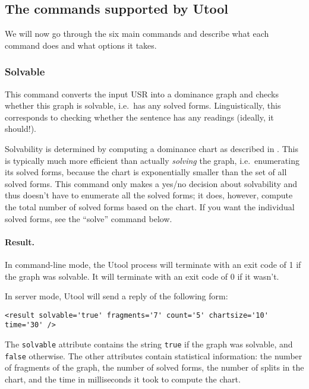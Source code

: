 \subsection{The commands supported by Utool}

We will now go through the six main commands and describe what each
command does and what options it takes.


\subsubsection{Solvable}

This command converts the input USR into a dominance graph and checks
whether this graph is solvable, i.e.\ has any solved
forms. Linguistically, this corresponds to checking whether the
sentence has any readings (ideally, it should!). 

Solvability is determined by computing a dominance chart as described
in \cite{KolTha05b}. This is typically much more efficient than
actually \emph{solving} the graph, i.e.\ enumerating its solved forms,
because the chart is exponentially smaller than the set of all solved
forms. This command only makes a yes/no decision about solvability and
thus doesn't have to enumerate all the solved forms; it does, however, compute the total number of solved forms based on the chart. If you want the individual solved forms,
see the ``solve'' command below.


\paragraph{Result.}
In command-line mode, the Utool process will terminate with an exit
code of 1 if the graph was solvable. It will terminate with an exit
code of 0 if it wasn't. 

In server mode, Utool will send a reply of the following form:
\begin{verbatim}
<result solvable='true' fragments='7' count='5' chartsize='10' time='30' />
\end{verbatim}

The \verb?solvable? attribute contains the string \verb?true? if the
graph was solvable, and \verb?false? otherwise. The other attributes
contain statistical information: the number of fragments of the graph,
the number of solved forms, the number of splits in the chart, and the
time in milliseconds it took to compute the chart.


